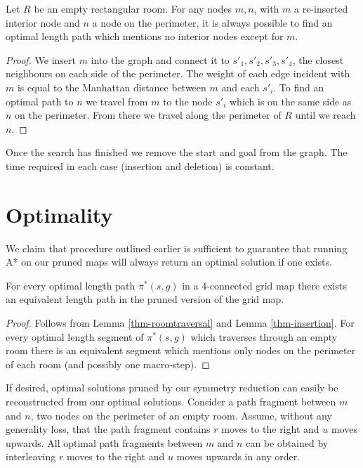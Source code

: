 \begin{lemma}
\label{thm-insertion}
Let $R$ be an empty rectangular room.
For any nodes $m, n$, with $m$ a re-inserted interior node and $n$ a node on the perimeter,
it is always possible to find an optimal length path which mentions no interior nodes except for $m$.
\end{lemma}
\begin{proof}
We insert $m$ into the graph and connect it to 
$s'_{1}, s'_{2}, s'_{3}, s'_{4}$, the closest neighbours on 
each side of the perimeter.
The weight of each edge incident with $m$ is equal to the Manhattan distance between
$m$ and each $s'_{i}$.
To find an optimal path to $n$ we travel from $m$ to the node $s'_{i}$ which is 
on the same side as $n$ on the perimeter.
From there we travel along the perimeter of $R$ until we reach $n$.
\end{proof}

Once the search has finished we remove the start and goal from the graph.
The time required in each case (insertion and deletion) is constant.

\section{Optimality}
We claim that procedure outlined earlier is sufficient to 
guarantee that running A* on our pruned maps will always return an optimal solution if one exists.

\begin{theorem}
For every optimal length path $\pi^*(s, g)$ in a 4-connected grid map there exists
an equivalent length path in the pruned version of the grid map.
\end{theorem}
\begin{proof}
Follows from Lemma \ref{thm-roomtraversal} and Lemma \ref{thm-insertion}.
For every optimal length segment of $\pi^{*}(s, g)$ which traverses
through an empty room there is an equivalent segment which mentions only nodes
on the perimeter of each room (and possibly one macro-step).
\end{proof}

If desired, optimal solutions pruned by our symmetry reduction can easily be reconstructed
from our optimal solutions.
Consider a path fragment between $m$ and $n$, two nodes on the perimeter of an empty room.
Assume, without any generality loss, that the path fragment contains $r$ moves to the right and $u$ moves upwards.
All optimal path fragments between $m$ and $n$ can be obtained by interleaving $r$ moves to the right
and $u$ moves upwards in any order.

